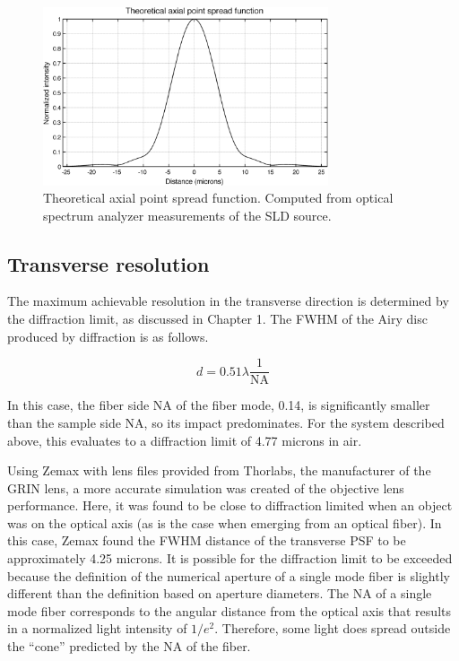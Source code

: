 \begin{figure}[h!]
\centering
\includegraphics[width=0.75\textwidth]{Images/Background/theoretical_axial_psf2.png}
\caption[Theoretical axial point spread function.]{Theoretical axial point spread function. Computed from optical spectrum analyzer measurements of the SLD source.\label{fig:axial_psf_matlab}}
\end{figure}

\subsection{Transverse resolution}
\label{sec:transverse_res}

The maximum achievable resolution in the transverse direction is determined by the diffraction limit, as discussed in Chapter 1. The FWHM of the Airy disc produced by diffraction is as follows. \cite{hecht}

\begin{equation} \label{eq:tres2_b}
d = 0.51 \lambda \frac{1}{\mathrm{NA}}
\end{equation}

In this case, the fiber side NA of the fiber mode, 0.14, is significantly smaller than the sample side NA, so its impact predominates. For the system described above, this evaluates to a diffraction limit of 4.77 microns in air.

Using Zemax with lens files provided from Thorlabs, the manufacturer of the GRIN lens, a more accurate simulation was created of the objective lens performance. Here, it was found to be close to diffraction limited when an object was on the optical axis (as is the case when emerging from an optical fiber). In this case, Zemax found the FWHM distance of the transverse PSF to be approximately 4.25 microns. It is possible for the diffraction limit to be exceeded because the definition of the numerical aperture of a single mode fiber is slightly different than the definition based on aperture diameters. The NA of a single mode fiber corresponds to the angular distance from the optical axis that results in a normalized light intensity of $1/e^2$. Therefore, some light does spread outside the ``cone'' predicted by the NA of the fiber.


